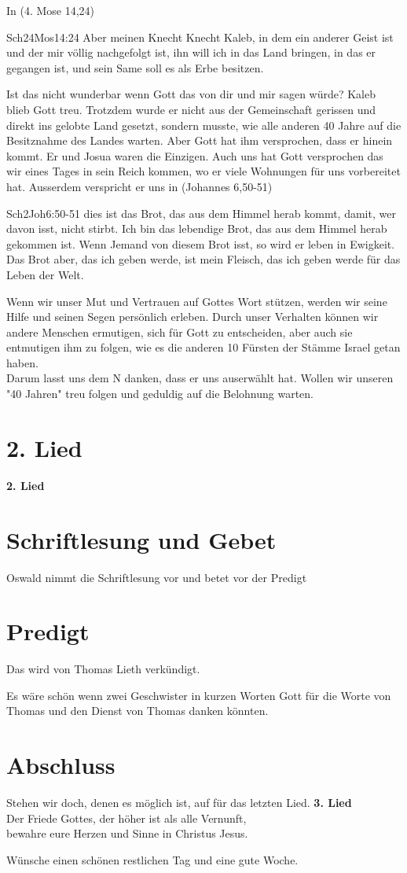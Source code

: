 \documentclass{../inc/mybib}
\begin{document}
In (4. Mose 14,24)
\begin{bibeltext}{Sch2}{4Mos}{14:24}
Aber meinen Knecht Knecht Kaleb, in dem ein anderer Geist ist und der mir völlig nachgefolgt ist, ihn will ich in das Land bringen, in das er gegangen ist, und sein Same soll es als Erbe besitzen.
\end{bibeltext}
Ist das nicht wunderbar wenn Gott das von dir und mir sagen würde? Kaleb blieb Gott treu. Trotzdem wurde er nicht aus der Gemeinschaft gerissen und direkt ins gelobte Land gesetzt, sondern musste, wie alle anderen 40 Jahre auf die Besitznahme des Landes warten. Aber Gott hat ihm versprochen, dass er hinein kommt. Er und Josua waren die Einzigen. 
Auch uns hat Gott versprochen das wir eines Tages in sein Reich kommen, wo er viele Wohnungen für uns vorbereitet hat. Ausserdem verspricht er uns in (Johannes 6,50-51)
\begin{bibeltext}{Sch2}{Joh}{6:50-51}
dies ist das Brot, das aus dem Himmel herab kommt, damit, wer davon isst, nicht stirbt. Ich bin das lebendige Brot, das aus dem Himmel herab gekommen ist. Wenn Jemand von diesem Brot isst, so wird er leben in Ewigkeit. Das Brot aber, das ich geben werde, ist mein Fleisch, das ich geben werde für das Leben der Welt.
\end{bibeltext}
Wenn wir unser Mut und Vertrauen auf Gottes Wort stützen, werden wir seine Hilfe und seinen Segen persönlich erleben. Durch unser Verhalten können wir andere Menschen ermutigen, sich für Gott zu entscheiden, aber auch sie entmutigen ihm zu folgen, wie es die anderen 10 Fürsten der Stämme Israel getan haben.\\
Darum lasst uns dem \herr N danken, dass er uns auserwählt hat. Wollen wir unseren "40 Jahren" treu folgen und geduldig auf die Belohnung warten.

\section{2. Lied}

\textbf{2. Lied}

\section{Schriftlesung und Gebet}
Oswald nimmt die Schriftlesung vor und betet vor der Predigt

\section{Predigt}
Das wird von Thomas Lieth verkündigt.

Es wäre schön wenn zwei Geschwister in kurzen Worten Gott für die Worte von Thomas und den Dienst von Thomas danken könnten.

\section{Abschluss}
Stehen wir doch, denen es möglich ist, auf für das letzten Lied.
\textbf{3. Lied}
\\
Der Friede Gottes, der höher ist als alle Vernunft,\\
bewahre eure Herzen und Sinne in Christus Jesus.

Wünsche einen schönen restlichen Tag und eine gute Woche.
\end{document}
